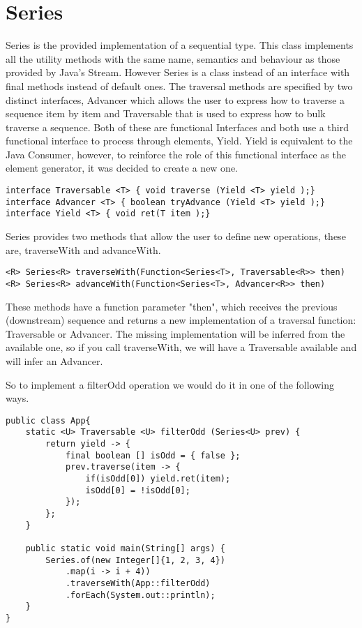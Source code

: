 \section{Series}

Series is the provided implementation of a sequential type. This class implements all the utility methods with the same name, semantics and behaviour as those provided by Java's Stream. However Series is a class instead of an interface with final methods instead of default ones. The traversal methods are specified by two distinct interfaces, Advancer which allows the user to express how to traverse a sequence item by item and Traversable that is used to express how to bulk traverse a sequence. Both of these are functional Interfaces and both use a third functional interface to process through elements, Yield. Yield is equivalent to the Java Consumer, however, to reinforce the role of this functional interface as the element generator, it was decided to create a new one.
\begin{lstlisting}[caption={Interfaces},captionpos=b]
interface Traversable <T> { void traverse (Yield <T> yield );}
interface Advancer <T> { boolean tryAdvance (Yield <T> yield );}
interface Yield <T> { void ret(T item );}
\end{lstlisting}

Series provides two methods that allow the user to define new operations, these are, traverseWith and advanceWith.
\begin{lstlisting}[caption={Traversal function generators},captionpos=b]
<R> Series<R> traverseWith(Function<Series<T>, Traversable<R>> then)
<R> Series<R> advanceWith(Function<Series<T>, Advancer<R>> then)
\end{lstlisting}
These methods have a function parameter "then", which receives the previous (downstream) sequence and returns a new implementation of a traversal function: Traversable or Advancer. The missing implementation will be inferred from the available one, so if you call traverseWith, we will have a Traversable available and will infer an Advancer.

\newpage
So to implement a filterOdd operation we would do it in one of the following ways.
\begin{lstlisting}[caption={filterOdd using traverseWith},captionpos=b]
public class App{
	static <U> Traversable <U> filterOdd (Series<U> prev) {
		return yield -> {
			final boolean [] isOdd = { false };
			prev.traverse(item -> {
				if(isOdd[0]) yield.ret(item);
				isOdd[0] = !isOdd[0];
			});
		};
	}

	public static void main(String[] args) {
		Series.of(new Integer[]{1, 2, 3, 4})
            .map(i -> i + 4))
            .traverseWith(App::filterOdd)
            .forEach(System.out::println);
	}
}
\end{lstlisting}

